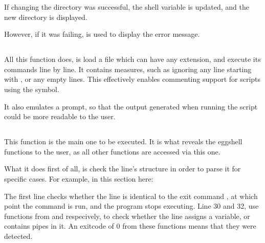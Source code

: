 \documentclass[12pt, a4paper]{report}
\begin{document}
                If changing the directory was successful, the  shell
                variable is updated, and the new directory is displayed.

                However, if it was failing,  is used to display the
                error message.
            
            \subsection{}
                All this function does, is load a  file which can have
                any extension, and execute its commands line by line. It contains
                measures, such as ignoring any line starting with \tx{\#}, or 
                any empty lines. This effectively enables commenting support for 
                scripts using the \tx{\#} symbol.

                It also emulates a prompt, so that the output generated when running 
                the script could be more readable to the user.

                \clearpage
            
            \subsection{}
                This function is the main one to be executed.
                It is what reveals the eggshell functions to the user,
                as all other functions are accessed via this one.

                What it does first of all, is check the line's structure
                in order to parse it for specific cases. For example, in 
                this section here:
                
                \begingroup
                \fontsize{10pt}{10pt}\selectfont
                \endgroup
                The first line checks whether the line is identical to the
                exit command , at which point the  command
                is run, and the program stops executing. Line 30 and 32, use
                functions from  and  respecively,
                to check whether the line assigns a variable, or contains pipes in it.
                An exitcode of 0 from these functions means that they were detected.
\end{document}
